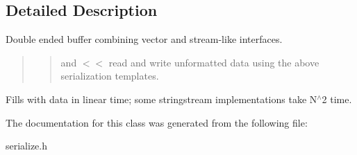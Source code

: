 \subsection{Detailed Description}
Double ended buffer combining vector and stream-\/like interfaces.

\begin{quote}
\begin{quote}
and $<$$<$ read and write unformatted data using the above serialization templates. \end{quote}
\end{quote}
Fills with data in linear time; some stringstream implementations take N$^\wedge$2 time. 

The documentation for this class was generated from the following file\+:\begin{DoxyCompactItemize}
\item 
serialize.\+h\end{DoxyCompactItemize}
